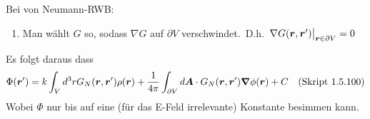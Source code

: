 \begin{enumerate}
        Bei von Neumann-RWB:
        \begin{enumerate}
          \item Man wählt $G$ so, sodass $\nabla G$ auf $\partial V$ 
          verschwindet.\ D.h. $\eval{\nabla G(\vb*r,\vb*r')}_{\vb*r\in\partial V}=0$
        \end{enumerate}
        Es folgt daraus dass 
        \begin{equation*}
          \displaystyle \Phi(\vb* r')=
            k\int_V d^3r G_N(\vb* r,\vb* r')\rho(\vb* r)
            +\frac{1}{4\pi} \int_{\partial V} d\vb* A \cdot 
            G_N(\vb* r,\vb* r')\grad\phi(\vb* r) + C \quad\text{(Skript 1.5.100)}
        \end{equation*}
        Wobei $\Phi$ nur bis auf eine (für das E-Feld irrelevante) 
        Konstante besimmen kann.

\end{enumerate}
